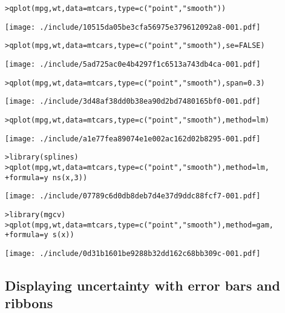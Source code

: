 \begin{alltt}
> qplot(mpg, wt, data = mtcars, type = c("point", "smooth"))
\end{alltt}
\texttt{[image: ./include/10515da05be3cfa56975e379612092a8-001.pdf]}
\begin{alltt}

> qplot(mpg, wt, data = mtcars, type = c("point", "smooth"), se = FALSE)
\end{alltt}
\texttt{[image: ./include/5ad725ac0e4b4297f1c6513a743db4ca-001.pdf]}
\begin{alltt}

> qplot(mpg, wt, data = mtcars, type = c("point", "smooth"), span = 0.3)
\end{alltt}
\texttt{[image: ./include/3d48af38dd0b38ea90d2bd7480165bf0-001.pdf]}
\begin{alltt}

> qplot(mpg, wt, data = mtcars, type = c("point", "smooth"), method = lm)
\end{alltt}
\texttt{[image: ./include/a1e77fea89074e1e002ac162d02b8295-001.pdf]}
\begin{alltt}

> library(splines)
> qplot(mpg, wt, data = mtcars, type = c("point", "smooth"), method = lm, 
+     formula = y ~ ns(x, 3))
\end{alltt}
\texttt{[image: ./include/07789c6d0db8deb7d4e37d9ddc88fcf7-001.pdf]}
\begin{alltt}

> library(mgcv)
> qplot(mpg, wt, data = mtcars, type = c("point", "smooth"), method = gam, 
+     formula = y ~ s(x))
\end{alltt}
\texttt{[image: ./include/0d31b1601be9288b32dd162c68bb309c-001.pdf]}
\begin{alltt}

\end{alltt}

\subsection{Displaying uncertainty with error bars and ribbons}\label{sub:error_bars}


